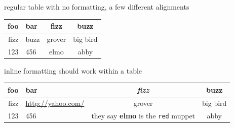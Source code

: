 

regular table with no formatting, a few different alignments


\begin{tabular}{r l c c}
  foo & bar & fizz & buzz \\
  \hline
  fizz & buzz & grover & big bird \\
  123 & 456 & elmo & abby \\
\end{tabular}


inline formatting should work within a table


\begin{tabular}{r l c c}
  foo & bar & \emph{fizz} & buzz \\
  \hline
  fizz & \url{http://yahoo.com/} & grover & big bird \\
  123 & 456 & they say \textbf{elmo} is the \verb|red|  muppet & abby \\
\end{tabular}